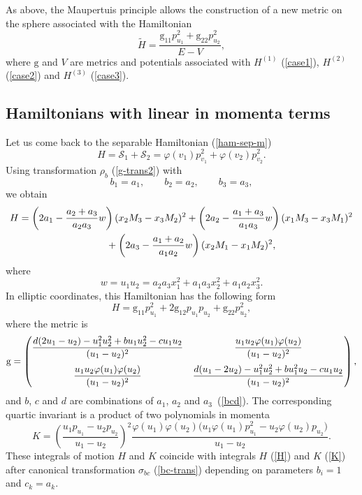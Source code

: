 \documentclass[10pt,a4paper]{amsart}
\numberwithin{equation}{section}
\begin{document}
As above, the Maupertuis principle allows the construction of a new metric on the sphere associated with the Hamiltonian
\[
\widetilde{H}=\frac{\mathrm g_{11}p^2_{u_1}+\mathrm g_{22}p^2_{u_2}}{E-V},
\]
where $\mathrm g$ and $V$ are metrics and potentials associated with $H^{(1)}$ (\ref{case1}), $H^{(2)}$ (\ref{case2}) and $H^{(3)}$ (\ref{case3}).

\subsection{Hamiltonians with linear in momenta terms}
Let us come back to the separable Hamiltonian (\ref{ham-sep-m})
\[
H=\mathcal{S}_1+\mathcal{S}_2=\varphi(v_1)p_{v_1}^2+\varphi(v_2)p_{v_2}^2 .
\]
 Using transformation $\rho_b$ (\ref{g-trans2}) with
\[b_1=a_1,\qquad b_2=a_2,\qquad b_3=a_3,\]
we obtain
\begin{gather*}
H= \left(2a_1 - \dfrac{a_2 + a_3}{a_2a_3} w\right)(x_2M_3-x_3M_2)^2
+\left(2a_2 -\dfrac{a_1 + a_3}{a_1a_3} w\right)(x_1M_3-x_3M_1)^2\\
\hphantom{H=}{} + \left(2a_3 -\dfrac{a_1 + a_2}{a_1a_2} w\right)(x_2M_1 -x_1M_2)^2 ,
\end{gather*}
where
\[
w=u_1u_2=a_2a_3x_1^2+a_1a_3x_2^2+a_1a_2x_3^2 .
\]
In elliptic coordinates, this Hamiltonian has the following form
\begin{equation}\label{b-h0}
H={\mathrm g}_{11}p_{u_1}^2+2{\mathrm g}_{12}p_{u_1}p_{u_2}+{\mathrm g}_{22}p_{u_2}^2 ,
\end{equation}
where the metric is
\[
{\mathrm g}=\left(
 \begin{matrix}
 \dfrac{d(2u_1 - u_2) - u_1^2u_2^2 + bu_1u_2^2 - cu_1u_2}{(u_1 - u_2)^2} & \dfrac{u_1u_2\varphi(u_1)\varphi(u_2)}{(u_1 - u_2)^2}\vspace{2mm} \\
 \dfrac{u_1u_2\varphi(u_1)\varphi(u_2)}{(u_1 - u_2)^2} &\dfrac{d(u_1 -2 u_2) - u_1^2u_2^2 + bu_1^2u_2 - cu_1u_2}{(u_1 - u_2)^2}
 \end{matrix}
 \right) ,
\]
and $b$, $c$ and $d$ are combinations of $a_1$, $a_2$ and $a_3$~(\ref{bcd}). The corresponding quartic invariant is a product of two polynomials in momenta
\begin{equation}\label{b-k0}
K=\left(\frac{u_1p_{u_1} -u_2p_{u_2} }{u_1 - u_2}\right)^2\frac{\varphi(u_1)\varphi(u_2)\big(u_1\varphi(u_1)p_{u_1}^2-u_2\varphi(u_2)p_{u_2}\big)}{u_1-u_2} .
\end{equation}
These integrals of motion $H$ and $K$ coincide with integrals $H$ (\ref{H}) and $K$ (\ref{K}) after canonical transformation $\sigma_{bc}$ (\ref{bc-trans}) depending on parameters $b_i=1$ and $c_k=a_k$.
\end{document}
